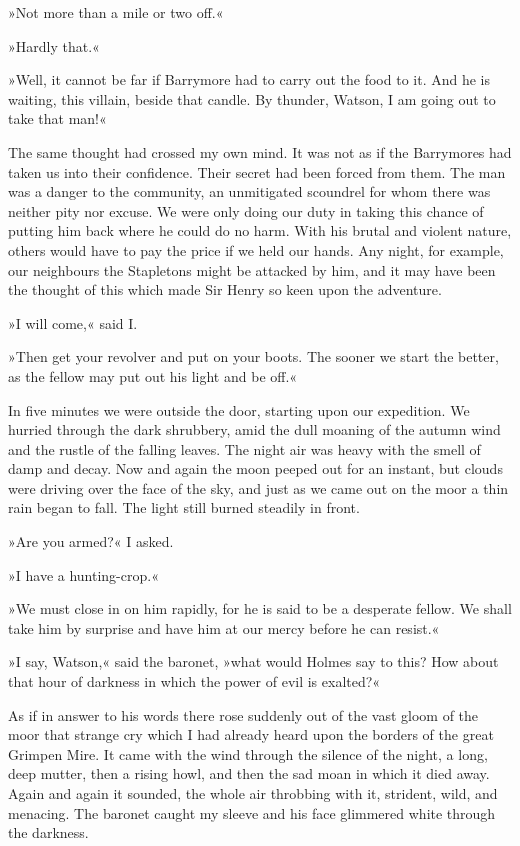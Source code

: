 »Not more than a mile or two off.«

»Hardly that.«

»Well, it cannot be far if Barrymore had to carry out the food to it. And he is waiting, this villain, beside that candle. By thunder, Watson, I am going out to take that man!«

The same thought had crossed my own mind. It was not as if the Barrymores had taken us into their confidence. Their secret had been forced from them. The man was a danger to the community, an unmitigated scoundrel for whom there was neither pity nor excuse. We were only doing our duty in taking this chance of putting him back where he could do no harm. With his brutal and violent nature, others would have to pay the price if we held our hands. Any night, for example, our neighbours the Stapletons might be attacked by him, and it may have been the thought of this which made Sir Henry so keen upon the adventure.

»I will come,« said I.

»Then get your revolver and put on your boots. The sooner we start the better, as the fellow may put out his light and be off.«

In five minutes we were outside the door, starting upon our expedition. We hurried through the dark shrubbery, amid the dull moaning of the autumn wind and the rustle of the falling leaves. The night air was heavy with the smell of damp and decay. Now and again the moon peeped out for an instant, but clouds were driving over the face of the sky, and just as we came out on the moor a thin rain began to fall. The light still burned steadily in front.

»Are you armed?« I asked.

»I have a hunting-crop.«

»We must close in on him rapidly, for he is said to be a desperate fellow. We shall take him by surprise and have him at our mercy before he can resist.«

»I say, Watson,« said the baronet, »what would Holmes say to this? How about that hour of darkness in which the power of evil is exalted?«

As if in answer to his words there rose suddenly out of the vast gloom of the moor that strange cry which I had already heard upon the borders of the great Grimpen Mire. It came with the wind through the silence of the night, a long, deep mutter, then a rising howl, and then the sad moan in which it died away. Again and again it sounded, the whole air throbbing with it, strident, wild, and menacing. The baronet caught my sleeve and his face glimmered white through the darkness.

